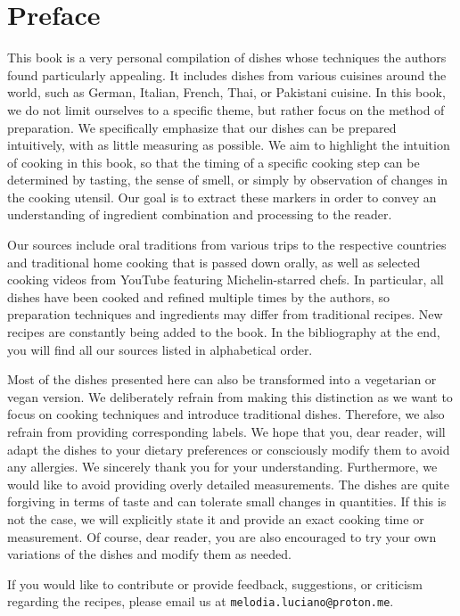 \chapter*{Preface}
This book is a very personal compilation of dishes whose techniques the authors found particularly appealing. It includes dishes from various cuisines around the world, such as German, Italian, French, Thai, or Pakistani cuisine. In this book, we do not limit ourselves to a specific theme, but rather focus on the method of preparation. We specifically emphasize that our dishes can be prepared intuitively, with as little measuring as possible. We aim to highlight the intuition of cooking in this book, so that the timing of a specific cooking step can be determined by tasting, the sense of smell, or simply by observation of changes in the cooking utensil. Our goal is to extract these markers in order to convey an understanding of ingredient combination and processing to the reader.

Our sources include oral traditions from various trips to the respective countries and traditional home cooking that is passed down orally, as well as selected cooking videos from YouTube featuring Michelin-starred chefs. In particular, all dishes have been cooked and refined multiple times by the authors, so preparation techniques and ingredients may differ from traditional recipes. New recipes are constantly being added to the book. In the bibliography at the end, you will find all our sources listed in alphabetical order.

Most of the dishes presented here can also be transformed into a vegetarian or vegan version. We deliberately refrain from making this distinction as we want to focus on cooking techniques and introduce traditional dishes. Therefore, we also refrain from providing corresponding labels. We hope that you, dear reader, will adapt the dishes to your dietary preferences or consciously modify them to avoid any allergies. We sincerely thank you for your understanding. Furthermore, we would like to avoid providing overly detailed measurements. The dishes are quite forgiving in terms of taste and can tolerate small changes in quantities. If this is not the case, we will explicitly state it and provide an exact cooking time or measurement. Of course, dear reader, you are also encouraged to try your own variations of the dishes and modify them as needed.

If you would like to contribute or provide feedback, suggestions, or criticism regarding the recipes, please email us at \texttt{melodia.luciano@proton.me}.